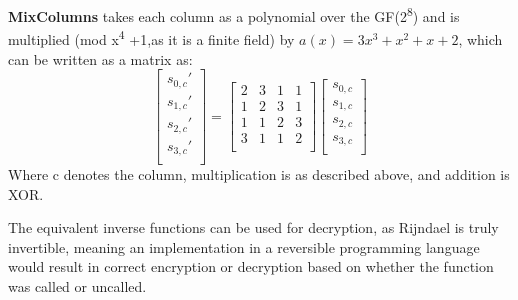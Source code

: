 \documentclass[a4paper, openany]{book}
\begin{document}
\begin{abstact}
\textbf{MixColumns} takes each column as a polynomial over the GF(2\textsuperscript{8}) and is multiplied (mod x\textsuperscript{4} +1,as it is a finite field) by \(a(x) = 3x^3 + x^2 + x + 2\), which can be written as a matrix as:
\[
\begin{bmatrix}
 s_{0,c}' \\
 s_{1,c}' \\
 s_{2,c}' \\
 s_{3,c}' \\
\end{bmatrix}=
\begin{bmatrix}
 2 & 3 & 1 & 1 \\
 1 & 2 & 3 & 1 \\
 1 & 1 & 2 & 3 \\
 3 & 1 & 1 & 2 \\
\end{bmatrix}
\begin{bmatrix}
 s_{0,c} \\
 s_{1,c} \\
 s_{2,c} \\
 s_{3,c} \\
\end{bmatrix}
\]
Where c denotes the column, multiplication is as described above, and addition is XOR.

The equivalent inverse functions can be used for decryption, as Rijndael is truly invertible, meaning an implementation in a reversible programming language would result in correct encryption or decryption based on whether the function was called or uncalled.


\end{abstact}
\end{document}
